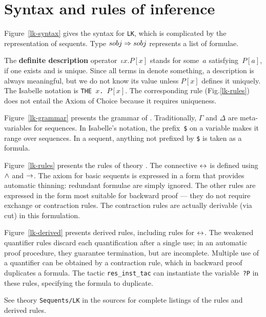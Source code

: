 \section{Syntax and rules of inference}

Figure~\ref{lk-syntax} gives the syntax for {\tt LK}, which is complicated
by the representation of sequents.  Type $sobj\Rightarrow sobj$ represents a list
of formulae.

The {\bf definite description} operator~$\iota x. P[x]$ stands for some~$a$
satisfying~$P[a]$, if one exists and is unique.  Since all terms in \LK{}
denote something, a description is always meaningful, but we do not know
its value unless $P[x]$ defines it uniquely.  The Isabelle notation is
\hbox{\tt THE $x$. $P[x]$}.  The corresponding rule (Fig.\ts\ref{lk-rules})
does not entail the Axiom of Choice because it requires uniqueness.

Figure~\ref{lk-grammar} presents the grammar of \LK.  Traditionally,
\(\Gamma\) and \(\Delta\) are meta-variables for sequences.  In Isabelle's
notation, the prefix~\verb|$| on a variable makes it range over sequences.
In a sequent, anything not prefixed by \verb|$| is taken as a formula.

Figure~\ref{lk-rules} presents the rules of theory .  The
connective $\leftrightarrow$ is defined using $\wedge$ and $\rightarrow$.  The axiom for
basic sequents is expressed in a form that provides automatic thinning:
redundant formulae are simply ignored.  The other rules are expressed in
the form most suitable for backward proof --- they do not require exchange
or contraction rules.  The contraction rules are actually derivable (via
cut) in this formulation.

Figure~\ref{lk-derived} presents derived rules, including rules for
$\leftrightarrow$.  The weakened quantifier rules discard each quantification after a
single use; in an automatic proof procedure, they guarantee termination,
but are incomplete.  Multiple use of a quantifier can be obtained by a
contraction rule, which in backward proof duplicates a formula.  The tactic
{\tt res_inst_tac} can instantiate the variable~{\tt?P} in these rules,
specifying the formula to duplicate.

See theory {\tt Sequents/LK} in the sources for complete listings of
the rules and derived rules.


